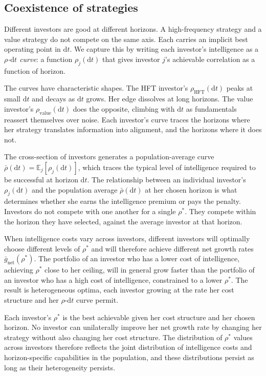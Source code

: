 \documentclass[11pt]{article}
\newcommand{\E}{\mathbb{E}}
\newcommand{\dd}{\mathrm{d}}
\begin{document}
\subsection{Coexistence of strategies}

Different investors are good at different horizons. A high-frequency
strategy and a value strategy do not compete on the same axis. Each
carries an implicit best operating point in $\dd t$. We capture this
by writing each investor's intelligence as a \emph{$\rho$-$\dd t$
curve}: a function $\rho_{j}(\dd t)$ that gives investor $j$'s
achievable correlation as a function of horizon.

The curves have characteristic shapes. The HFT investor's
$\rho_{\text{HFT}}(\dd t)$ peaks at small $\dd t$ and decays as
$\dd t$ grows. Her edge dissolves at long horizons. The value
investor's $\rho_{\text{value}}(\dd t)$ does the opposite, climbing
with $\dd t$ as fundamentals reassert themselves over noise. Each
investor's curve traces the horizons where her strategy translates
information into alignment, and the horizons where it does not.

The cross-section of investors generates a population-average curve
$\bar{\rho}(\dd t) = \E_{j}[\rho_{j}(\dd t)]$, which traces the
typical level of intelligence required to be successful at horizon
$\dd t$. The relationship between an individual investor's
$\rho_{j}(\dd t)$ and the population average $\bar{\rho}(\dd t)$ at
her chosen horizon is what determines whether she earns the
intelligence premium or pays the penalty. Investors do not compete
with one another for a single $\rho^{*}$. They compete within the
horizon they have selected, against the average investor at that
horizon.

When intelligence costs vary across investors, different investors
will optimally choose different levels of $\rho^{*}$ and will
therefore achieve different net growth rates
$\bar{g}_{\mathrm{net}}(\rho^{*})$. The portfolio of an investor who
has a lower cost of intelligence, achieving $\rho^{*}$ close to her
ceiling, will in general grow faster than the portfolio of an
investor who has a high cost of intelligence, constrained to a
lower $\rho^{*}$. The result is heterogeneous optima, each investor
growing at the rate her cost structure and her $\rho$-$\dd t$ curve
permit.

Each investor's $\rho^{*}$ is the best achievable given her cost
structure and her chosen horizon. No investor can unilaterally
improve her net growth rate by changing her strategy without also
changing her cost structure. The distribution of $\rho^{*}$ values
across investors therefore reflects the joint distribution of
intelligence costs and horizon-specific capabilities in the
population, and these distributions persist as long as their
heterogeneity persists.
\end{document}
